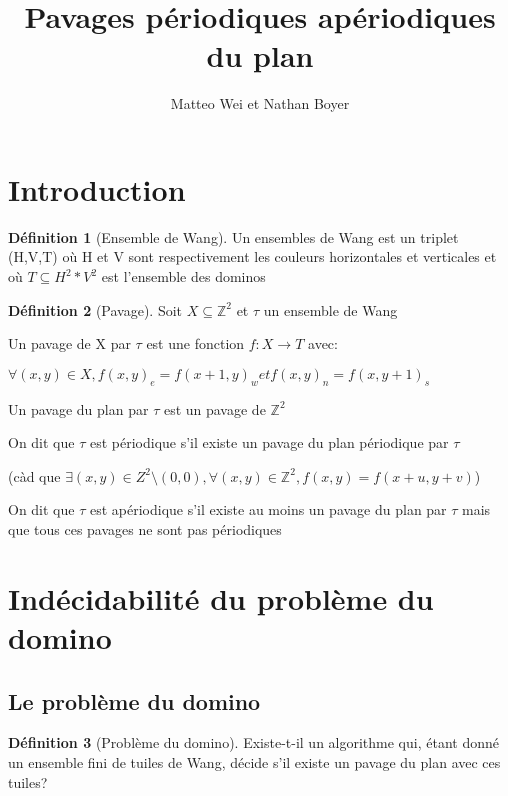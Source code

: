 \documentclass{scrartcl}
\title{Pavages périodiques apériodiques du plan}
\author{Matteo Wei et Nathan Boyer}
\newcommand{\Z}{\mathbb Z}
\newcommand{\sube}{\subseteq}
\theoremstyle{definition}
\newtheorem{definition}{Définition}
\theoremstyle{remark}
\begin{document}
\maketitle

\section{Introduction}

\begin{definition}[Ensemble de Wang]
    
Un ensembles de Wang est un triplet (H,V,T) où H et V sont respectivement les couleurs horizontales et verticales
et où $T \sube H^2 * V^2$ est l'ensemble des dominos

\end{definition}

\begin{definition}[Pavage]

Soit $X \sube \Z^2$ et $\tau$ un ensemble de Wang

Un pavage de X par $\tau$ est une fonction $f:X \to T$ avec:

$\forall (x,y) \in X, {f(x,y)}_e = {f(x+1,y)}_w et {f(x,y)}_n = {f(x,y+1)}_s$

Un pavage du plan par $\tau$ est un pavage de $\Z^2$

On dit que $\tau$ est périodique s'il existe un pavage du plan périodique par $\tau$

(càd que $\exists (x,y) \in Z^2 \setminus (0,0), \forall (x,y) \in \Z^2, f(x,y) = f(x+u,y+v)$)

On dit que $\tau$ est apériodique s'il existe au moins un pavage du plan par $\tau$ mais que tous ces pavages ne sont pas périodiques

    
\end{definition}



\section{Indécidabilité du problème du domino}

\subsection{Le problème du domino}

\begin{definition}[Problème du domino]
  Existe-t-il un algorithme qui, étant donné un ensemble fini de tuiles de Wang, décide s'il existe un pavage du plan avec ces tuiles?
\end{definition}
\end{document}
